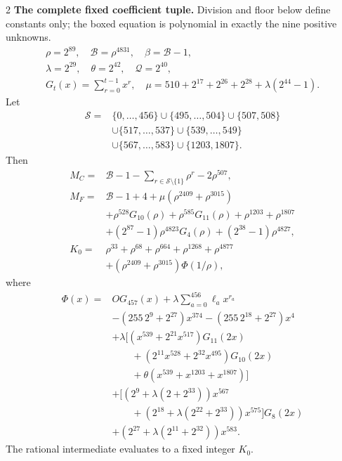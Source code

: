\documentclass[10pt]{article}
\let\bigsum\sum
\renewcommand{\sum}{\bigsum\nolimits}
\newcommand{\rng}[2]{\{#1,\ldots,#2\}}
\begin{document}
\begin{multicols}{2}
\textbf{The complete fixed coefficient tuple.}
Division and floor below define constants only; the boxed equation is
polynomial in exactly the nine positive unknowns.
\[
\begin{gathered}
\rho=2^{89},\quad\mathcal B=\rho^{4831},\quad\beta=\mathcal B-1,\\
\lambda=2^{29},\quad\theta=2^{42},\quad\mathcal Q=2^{40},\\
G_t(x)=\sum_{r=0}^{t-1}x^r,\quad
\mu=510+2^{17}+2^{26}+2^{28}+\lambda(2^{44}-1).
\end{gathered}
\]
Let
\[
\begin{aligned}
\mathcal S={}&\rng0{456}\cup\rng{495}{504}\cup\{507,508\}\\
 &\cup\rng{517}{537}\cup\rng{539}{549}\\
 &\cup\rng{567}{583}\cup\{1203,1807\}.
\end{aligned}
\]
Then
\[
\begin{aligned}
M_C={}&\mathcal B-1-\sum_{r\in\mathcal S\setminus\{1\}}\rho^r-2\rho^{507},\\
M_F={}&\mathcal B-1+4+\mu(\rho^{2409}+\rho^{3015})\\
 &+\rho^{528}G_{10}(\rho)+\rho^{585}G_{11}(\rho)+\rho^{1203}+\rho^{1807}\\
 &+(2^{87}-1)\rho^{4823}G_4(\rho)+(2^{38}-1)\rho^{4827},\\
K_0={}&\rho^{33}+\rho^{68}+\rho^{664}+\rho^{1268}+\rho^{4877}\\
 &+(\rho^{2409}+\rho^{3015})\Phi(1/\rho),
\end{aligned}
\]
where
\[
\begin{aligned}
\Phi(x)={}&O G_{457}(x)+\lambda\sum_{a=0}^{456}\ell_a x^{r_a}\\
 &-(255\,2^9+2^{27})x^{374}-(255\,2^{18}+2^{27})x^4\\
 &+\lambda\bigl[(x^{539}+2^{21}x^{517})G_{11}(2x)\\
 &\qquad +(2^{11}x^{528}+2^{32}x^{495})G_{10}(2x)\\
 &\qquad +\theta(x^{539}+x^{1203}+x^{1807})\bigr]\\
 &+\bigl[(2^9+\lambda(2+2^{33}))x^{567}\\
 &\qquad +(2^{18}+\lambda(2^{22}+2^{33}))x^{575}\bigr]G_8(2x)\\
 &+(2^{27}+\lambda(2^{11}+2^{32}))x^{583}.
\end{aligned}
\]
The rational intermediate evaluates to a fixed integer $K_0$.


\end{multicols}
\end{document}
